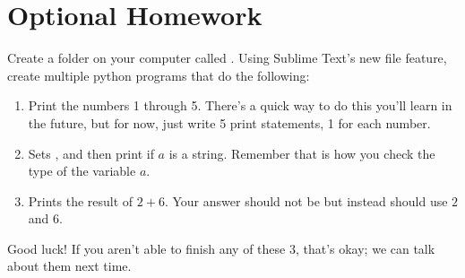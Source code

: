 \documentclass[12pt]{scrartcl}
\begin{document}
\section{Optional Homework}
Create a folder on your computer called . Using Sublime Text's new file feature, create multiple python programs that do the following:
\begin{enumerate}
    \item Print the numbers 1 through 5. There's a quick way to do this you'll learn in the future, but for now, just write 5 print statements, 1 for each number.
    \item Sets , and then print  if $a$ is a string. Remember that  is how you check the type of the variable $a$.
    \item Prints the result of $2 + 6.$ Your answer should not be  but instead should use $2$ and $6.$
\end{enumerate}

Good luck! If you aren't able to finish any of these 3, that's okay; we can talk about them next time.
\end{document}
